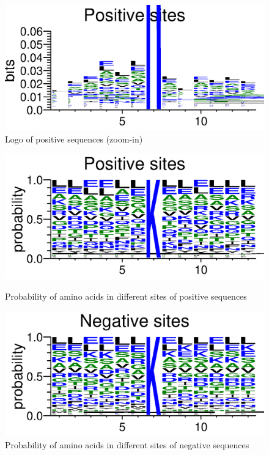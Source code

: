 \documentclass{article}
\begin{document}
\begin{enumerate}
\begin{figure}[htbp]
{        }
        \hfill
        \parbox{0.5\linewidth}{
            \centering
            \includegraphics[width=\linewidth]{images/positive_logo_zoom.png}
            \caption{Logo of positive sequences (zoom-in)}
        }
    \end{figure}
    \begin{figure}[htbp]
        \parbox{0.5\linewidth}{
            \centering
            \includegraphics[width=\linewidth]{images/positive_prob.png}
            \caption{Probability of amino acids in different sites of positive sequences}
        }
        \hfill
        \parbox{0.5\linewidth}{
            \centering
            
            \includegraphics[width=\linewidth]{images/negative_prob.png}
            \caption{Probability of amino acids in different sites of negative sequences}
        }
    \end{figure}


\end{enumerate}
\end{document}
